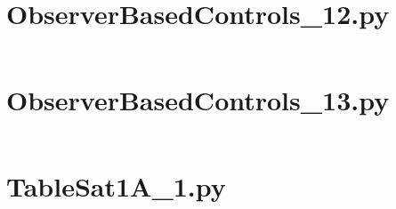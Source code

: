 \pagebreak
\section*{ObserverBasedControls\_12.py}\label{code:TSatPySamples/ObserverBasedControls_12.py}\inputminted[linenos,fontsize=\scriptsize]{python}{/home/dcouture/git/mathyourlife/TSatPy/tex/sample_scripts/ObserverBasedControls_12.py}

\pagebreak
\section*{ObserverBasedControls\_13.py}\label{code:TSatPySamples/ObserverBasedControls_13.py}\inputminted[linenos,fontsize=\scriptsize]{python}{/home/dcouture/git/mathyourlife/TSatPy/tex/sample_scripts/ObserverBasedControls_13.py}

\pagebreak
\section*{TableSat1A\_1.py}\label{code:TSatPySamples/TableSat1A_1.py}\inputminted[linenos,fontsize=\scriptsize]{python}{/home/dcouture/git/mathyourlife/TSatPy/tex/sample_scripts/TableSat1A_1.py}
